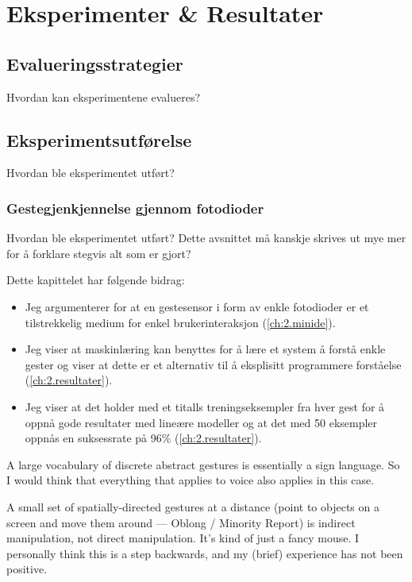 \section[Eksperimenter \& Resultater]{Eksperimenter \& Resultater}
\subsection{Evalueringsstrategier}
{\color{red}Hvordan kan eksperimentene evalueres?}

\subsection{Eksperimentsutførelse}
{\color{red}Hvordan ble eksperimentet utført?}

\subsubsection*{Gestegjenkjennelse gjennom fotodioder}
{\color{red}Hvordan ble eksperimentet utført?}
{\color{red}Dette avsnittet må kanskje skrives ut mye mer for å forklare stegvis alt som er gjort?}

Dette kapittelet har følgende bidrag:
\begin{itemize}
\item Jeg argumenterer for at en gestesensor i form av enkle fotodioder er et tilstrekkelig medium for enkel brukerinteraksjon (\ref{ch:2.minide}).
\item Jeg viser at maskinlæring kan benyttes for å lære et system å forstå enkle gester og viser at dette er et alternativ til å eksplisitt programmere forståelse (\ref{ch:2.resultater}).
\item Jeg viser at det holder med et titalls treningseksempler fra hver gest for å oppnå gode resultater med lineære modeller og at det med 50 eksempler oppnås en suksessrate på 96\% (\ref{ch:2.resultater}).
\end{itemize}

A large vocabulary of discrete abstract gestures is essentially a sign language. So I would think that everything that applies to voice also applies in this case.

A small set of spatially-directed gestures at a distance (point to objects on a screen and move them around — Oblong / Minority Report) is indirect manipulation, not direct manipulation. It's kind of just a fancy mouse. I personally think this is a step backwards, and my (brief) experience has not been positive.

